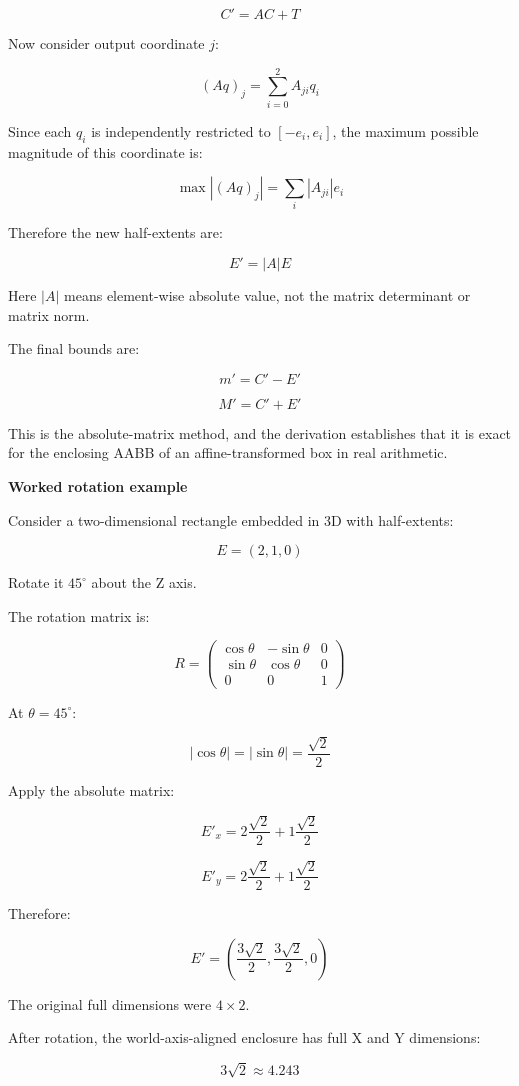 \[
\boxed{C'=AC+T}
\]

Now consider output coordinate \(j\):

\[
(Aq)_j=\sum_{i=0}^{2}A_{ji}q_i
\]

Since each \(q_i\) is independently restricted to \([-e_i,e_i]\), the maximum possible magnitude of this coordinate is:

\[
\max |(Aq)_j| = \sum_i|A_{ji}|e_i
\]

Therefore the new half-extents are:

\[
\boxed{ E'=|A|E }
\]

Here \(|A|\) means element-wise absolute value, not the matrix determinant or matrix norm.

The final bounds are:

\[
\boxed{ m'=C'-E' }
\]

\[
\boxed{ M'=C'+E' }
\]

This is the absolute-matrix method, and the derivation establishes that it is exact for the enclosing AABB of an affine-transformed box in real arithmetic.

\textbf{Worked rotation example}

Consider a two-dimensional rectangle embedded in 3D with half-extents:

\[
E=(2,1,0)
\]

Rotate it \(45^\circ\) about the Z axis.

The rotation matrix is:

\[
R= \begin{pmatrix} \cos\theta&-\sin\theta&0\\\ \sin\theta&\cos\theta&0\\\ 0&0&1 \end{pmatrix}
\]

At \(\theta=45^\circ\):

\[
|\cos\theta|=|\sin\theta|=\frac{\sqrt2}{2}
\]

Apply the absolute matrix:

\[
E'_x=2\frac{\sqrt2}{2}+1\frac{\sqrt2}{2}
\]

\[
E'_y=2\frac{\sqrt2}{2}+1\frac{\sqrt2}{2}
\]

Therefore:

\[
\boxed{ E'=\left(\frac{3\sqrt2}{2},\frac{3\sqrt2}{2},0\right) }
\]

The original full dimensions were \(4\times2\).

After rotation, the world-axis-aligned enclosure has full X and Y dimensions:

\[
3\sqrt2\approx4.243
\]


